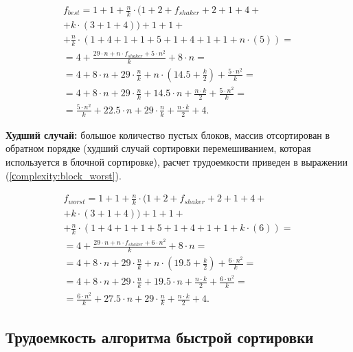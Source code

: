 \begin{equation}
	\label{сomplexity:block_best}
	\begin{gathered}
		f_{best} = 1 +1 + \frac{n}{k} \cdot(1 + 2+f_{shaker} + 2 + 1 + 4 + \\
		+ k \cdot (3 + 1 + 4)) + 1 + 1 + \\
		+ \frac{n}{k} \cdot (1 + 4 + 1 + 1 + 5 + 1 + 4 + 1 + 1 + n \cdot (5)) = \\
		= 4 + \frac{29\cdot n + n \cdot f_{shaker} + 5 \cdot n^2}{k}  + 8 \cdot n  = \\
		= 4 + 8 \cdot n + 29 \cdot \frac{n}{k} + n \cdot (14.5 + \frac{k}{2}) + \frac{5 \cdot n^2}{k} = \\
		= 4 + 8 \cdot n + 29 \cdot \frac{n}{k} + 14.5 \cdot n + \frac{n \cdot k}{2} + \frac{5 \cdot n^2}{k} = \\
		= \frac{5 \cdot n^2}{k} + 22.5 \cdot n + 29 \cdot \frac{n}{k} + \frac{n \cdot k}{2} + 4.
	\end{gathered}
\end{equation}

\textbf{Худший случай:} большое количество пустых блоков, массив отсортирован в обратном порядке (худший случай сортировки перемешиванием, которая используется в блочной сортировке), расчет трудоемкости приведен в выражении (\ref{сomplexity:block_worst}).

\begin{equation}
	\label{сomplexity:block_worst}
	\begin{gathered}
		f_{worst} = 1 +1 + \frac{n}{k} \cdot(1 + 2+f_{shaker} + 2 + 1 + 4 + \\
		+ k \cdot (3 + 1 + 4)) + 1 + 1 + \\
		 + \frac{n}{k} \cdot (1 + 4 + 1 + 1 + 5 + 1 + 4 + 1 + 1 + k \cdot (6)) = \\
		= 4 + \frac{29\cdot n + n \cdot f_{shaker} + 6 \cdot n^2}{k}  + 8 \cdot n  = \\
		= 4 + 8 \cdot n + 29 \cdot \frac{n}{k} + n \cdot (19.5 + \frac{k}{2}) + \frac{6 \cdot n^2}{k} = \\
		= 4 + 8 \cdot n + 29 \cdot \frac{n}{k} + 19.5 \cdot n + \frac{n \cdot k}{2} + \frac{6 \cdot n^2}{k} = \\
		= \frac{6 \cdot n^2}{k} + 27.5 \cdot n + 29 \cdot \frac{n}{k} + \frac{n \cdot k}{2} + 4.
	\end{gathered}
\end{equation}


\subsection{Трудоемкость алгоритма быстрой сортировки}

